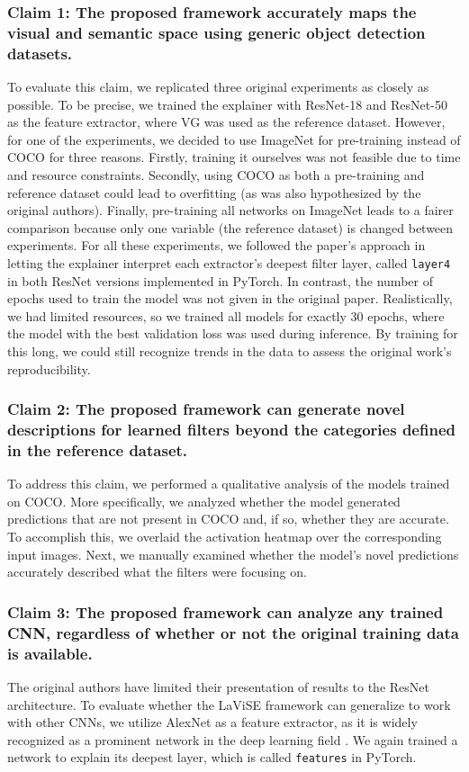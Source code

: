 \subsubsection{Claim 1: The proposed framework accurately maps the visual and semantic space using generic object detection datasets.}
To evaluate this claim, we replicated three original experiments as closely as possible. To be precise, we trained the explainer with ResNet-18 and ResNet-50 as the feature extractor, where VG was used as the reference dataset. However, for one of the experiments, we decided to use ImageNet for pre-training instead of COCO for three reasons. Firstly, training it ourselves was not feasible due to time and resource constraints. Secondly, using COCO as both a pre-training and reference dataset could lead to overfitting (as was also hypothesized by the original authors). Finally, pre-training all networks on ImageNet leads to a fairer comparison because only one variable (the reference dataset) is changed between experiments. For all these experiments, we followed the paper's approach in letting the explainer interpret each extractor's deepest filter layer, called \texttt{layer4} in both ResNet versions implemented in PyTorch.
In contrast, the number of epochs used to train the model was not given in the original paper. Realistically, we had limited resources, so we trained all models for exactly 30 epochs, where the model with the best validation loss was used during inference. By training for this long, we could still recognize trends in the data to assess the original work's reproducibility.

\subsubsection{Claim 2: The proposed framework can generate novel descriptions for learned filters beyond the categories defined in the reference dataset.}
To address this claim, we performed a qualitative analysis of the models trained on COCO. More specifically, we analyzed whether the model generated predictions that are not present in COCO and, if so, whether they are accurate. To accomplish this, we overlaid the activation heatmap over the corresponding input images. Next, we manually examined whether the model's novel predictions accurately described what the filters were focusing on.

\subsubsection{Claim 3: The proposed framework can analyze any trained CNN, regardless of whether or not the original training data is available.}
The original authors have limited their presentation of results to the ResNet architecture. To evaluate whether the LaViSE framework can generalize to work with other CNNs, we utilize AlexNet \cite{krizhevsky2017imagenet} as a feature extractor, as it is widely recognized as a prominent network in the deep learning field \cite{alom2018history}. We again trained a network to explain its deepest layer, which is called \texttt{features} in PyTorch.


